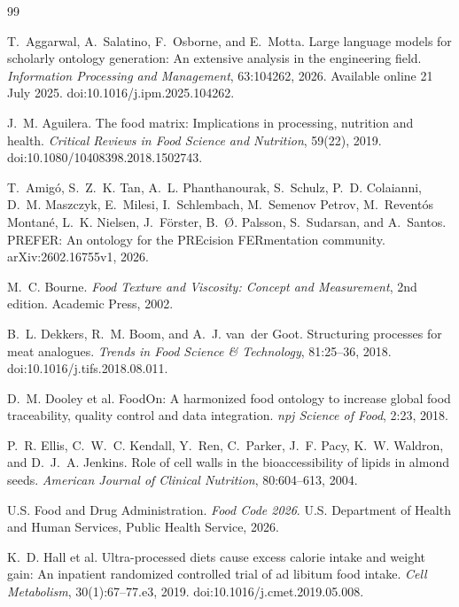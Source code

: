 \documentclass[11pt,openany]{book}
\theoremstyle{definition}
\begin{document}
\backmatter
\begin{thebibliography}{99}

T.~Aggarwal, A.~Salatino, F.~Osborne, and E.~Motta.
\newblock Large language models for scholarly ontology generation: An extensive analysis in the engineering field.
\newblock \emph{Information Processing and Management}, 63:104262, 2026.
\newblock Available online 21 July 2025. doi:10.1016/j.ipm.2025.104262.

J.~M. Aguilera.
\newblock The food matrix: Implications in processing, nutrition and health.
\newblock \emph{Critical Reviews in Food Science and Nutrition}, 59(22), 2019.
\newblock doi:10.1080/10408398.2018.1502743.

T.~Amigó, S.~Z.~K. Tan, A.~L. Phanthanourak, S.~Schulz, P.~D. Colaianni, D.~M. Maszczyk, E.~Milesi, I.~Schlembach, M.~Semenov Petrov, M.~Reventós Montané, L.~K. Nielsen, J.~Förster, B.~Ø. Palsson, S.~Sudarsan, and A.~Santos.
\newblock PREFER: An ontology for the PREcision FERmentation community.
\newblock arXiv:2602.16755v1, 2026.

M.~C. Bourne.
\newblock \emph{Food Texture and Viscosity: Concept and Measurement}, 2nd edition.
\newblock Academic Press, 2002.

B.~L. Dekkers, R.~M. Boom, and A.~J. van~der Goot.
\newblock Structuring processes for meat analogues.
\newblock \emph{Trends in Food Science \& Technology}, 81:25--36, 2018.
\newblock doi:10.1016/j.tifs.2018.08.011.

D.~M. Dooley et al.
\newblock FoodOn: A harmonized food ontology to increase global food traceability, quality control and data integration.
\newblock \emph{npj Science of Food}, 2:23, 2018.

P.~R. Ellis, C.~W.~C. Kendall, Y.~Ren, C.~Parker, J.~F. Pacy, K.~W. Waldron, and D.~J.~A. Jenkins.
\newblock Role of cell walls in the bioaccessibility of lipids in almond seeds.
\newblock \emph{American Journal of Clinical Nutrition}, 80:604--613, 2004.

U.S. Food and Drug Administration.
\newblock \emph{Food Code 2026}.
\newblock U.S. Department of Health and Human Services, Public Health Service, 2026.

K.~D. Hall et al.
\newblock Ultra-processed diets cause excess calorie intake and weight gain: An inpatient randomized controlled trial of ad libitum food intake.
\newblock \emph{Cell Metabolism}, 30(1):67--77.e3, 2019.
\newblock doi:10.1016/j.cmet.2019.05.008.


\end{thebibliography}
\end{document}
